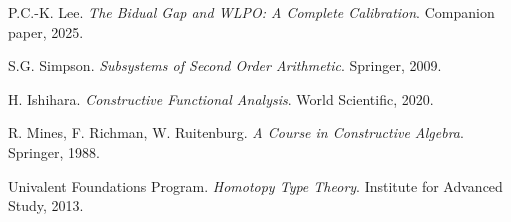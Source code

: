 \documentclass[11pt]{article}
\begin{document}
\begin{thebibliography}{10}
 P.C.-K. Lee. \emph{The Bidual Gap and WLPO: A Complete Calibration}. Companion paper, 2025.

 S.G. Simpson. \emph{Subsystems of Second Order Arithmetic}. Springer, 2009.

 H. Ishihara. \emph{Constructive Functional Analysis}. World Scientific, 2020.

 R. Mines, F. Richman, W. Ruitenburg. \emph{A Course in Constructive Algebra}. Springer, 1988.

 Univalent Foundations Program. \emph{Homotopy Type Theory}. Institute for Advanced Study, 2013.
\end{thebibliography}
\end{document}
